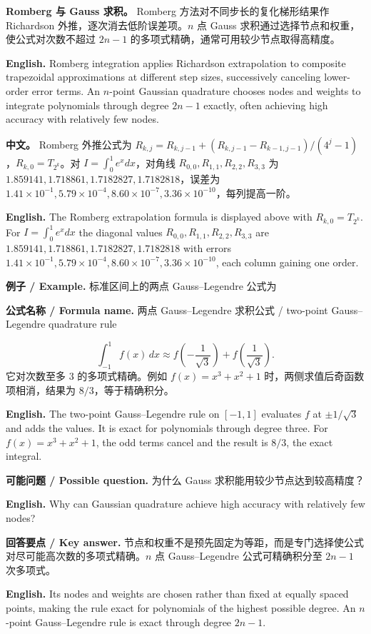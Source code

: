 \documentclass[UTF8,11pt,a4paper]{ctexart}
\newcommand{\EN}[1]{\par\noindent\textbf{English.} #1\par}
\newcommand{\FORMULA}[2]{\par\noindent\textbf{公式名称 / Formula name.} #1 / #2\par}
\newcommand{\EX}[2]{\par\noindent\textbf{例子 / Example.} #1\par\EN{#2}}
\newcommand{\ASK}[4]{\par\noindent\textbf{可能问题 / Possible question.} #1\par\EN{#2}\noindent\textbf{回答要点 / Key answer.} #3\par\EN{#4}\medskip}
\newcommand{\APS}[2]{\par\noindent\textbf{中文。} #1\par\noindent\textbf{English.} #2\par\smallskip}
\begin{document}
\noindent\textbf{Romberg 与 Gauss 求积。} Romberg 方法对不同步长的复化梯形结果作 Richardson 外推，逐次消去低阶误差项。$n$ 点 Gauss 求积通过选择节点和权重，使公式对次数不超过 $2n-1$ 的多项式精确，通常可用较少节点取得高精度。
\EN{Romberg integration applies Richardson extrapolation to composite trapezoidal approximations at different step sizes, successively canceling lower-order error terms. An $n$-point Gaussian quadrature chooses nodes and weights to integrate polynomials through degree $2n-1$ exactly, often achieving high accuracy with relatively few nodes.}
\APS{Romberg 外推公式为 $R_{k,j}=R_{k,j-1}+(R_{k,j-1}-R_{k-1,j-1})/(4^{j}-1)$，$R_{k,0}=T_{2^k}$。对 $I=\int_0^1e^x dx$，对角线 $R_{0,0},R_{1,1},R_{2,2},R_{3,3}$ 为 $1.859141,1.718861,1.7182827,1.7182818$，误差为 $1.41\times10^{-1},5.79\times10^{-4},8.60\times10^{-7},3.36\times10^{-10}$，每列提高一阶。}{The Romberg extrapolation formula is displayed above with $R_{k,0}=T_{2^k}$. For $I=\int_0^1e^x dx$ the diagonal values $R_{0,0},R_{1,1},R_{2,2},R_{3,3}$ are $1.859141,1.718861,1.7182827,1.7182818$ with errors $1.41\times10^{-1},5.79\times10^{-4},8.60\times10^{-7},3.36\times10^{-10}$, each column gaining one order.}

\EX{标准区间上的两点 Gauss--Legendre 公式为
\FORMULA{两点 Gauss--Legendre 求积公式}{two-point Gauss--Legendre quadrature rule}
\[
\int_{-1}^{1}f(x)\,dx\approx f\left(-\frac1{\sqrt3}\right)+f\left(\frac1{\sqrt3}\right).
\]
它对次数至多 $3$ 的多项式精确。例如 $f(x)=x^3+x^2+1$ 时，两侧求值后奇函数项相消，结果为 $8/3$，等于精确积分。}{The two-point Gauss--Legendre rule on $[-1,1]$ evaluates $f$ at $\pm1/\sqrt3$ and adds the values. It is exact for polynomials through degree three. For $f(x)=x^3+x^2+1$, the odd terms cancel and the result is $8/3$, the exact integral.}

\ASK{为什么 Gauss 求积能用较少节点达到较高精度？}{Why can Gaussian quadrature achieve high accuracy with relatively few nodes?}{节点和权重不是预先固定为等距，而是专门选择使公式对尽可能高次数的多项式精确。$n$ 点 Gauss--Legendre 公式可精确积分至 $2n-1$ 次多项式。}{Its nodes and weights are chosen rather than fixed at equally spaced points, making the rule exact for polynomials of the highest possible degree. An $n$-point Gauss--Legendre rule is exact through degree $2n-1$.}
\end{document}
